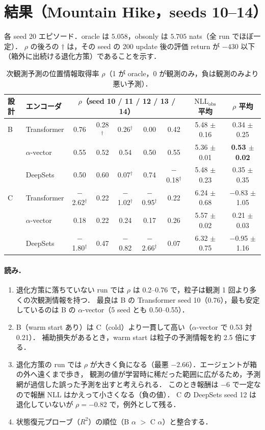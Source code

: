\documentclass[a4paper,11pt]{article}
\begin{document}
\section{結果（Mountain Hike，seeds 10--14）}

各 seed 20 エピソード．oracle は $5.058$，obsonly は $5.705$ nats（全 run でほぼ一定）．
$\rho$ の後ろの $\dagger$ は，その seed の 200 update 後の評価 return が $-430$ 以下（箱外に出続ける退化方策）であることを示す．

\begin{table}[htbp]
\centering
\small
\begin{tabular}{llccccccc}
\toprule
設計 & エンコーダ & \multicolumn{5}{c}{$\rho$（seed 10 / 11 / 12 / 13 / 14）} & $\mathrm{NLL}_{\mathrm{obs}}$ 平均 & $\rho$ 平均 \\
\midrule
B & Transformer   & 0.76 & 0.28$^\dagger$ & 0.26$^\dagger$ & 0.00 & 0.42 & 5.48 $\pm$ 0.16 & 0.34 $\pm$ 0.25 \\
  & $\alpha$-vector & 0.55 & 0.52 & 0.54 & 0.50 & 0.55 & 5.36 $\pm$ 0.01 & \textbf{0.53 $\pm$ 0.02} \\
  & DeepSets      & 0.50 & 0.60 & 0.07$^\dagger$ & 0.74 & $-$0.18$^\dagger$ & 5.48 $\pm$ 0.23 & 0.35 $\pm$ 0.35 \\
\midrule
C & Transformer   & $-$2.62$^\dagger$ & 0.22 & $-$1.02$^\dagger$ & $-$0.95$^\dagger$ & 0.22 & 6.24 $\pm$ 0.68 & $-$0.83 $\pm$ 1.05 \\
  & $\alpha$-vector & 0.18 & 0.22 & 0.24 & 0.17 & 0.26 & 5.57 $\pm$ 0.02 & 0.21 $\pm$ 0.03 \\
  & DeepSets      & $-$1.80$^\dagger$ & 0.47 & $-$0.82 & $-$2.66$^\dagger$ & 0.07 & 6.32 $\pm$ 0.75 & $-$0.95 $\pm$ 1.16 \\
\bottomrule
\end{tabular}
\caption{次観測予測の位置情報取得率 $\rho$（1 が oracle，0 が観測のみ，負は観測のみより悪い予測）．}
\end{table}

\paragraph{読み．}
\begin{enumerate}
  \item 退化方策に落ちていない run では $\rho$ は 0.2--0.76 で，粒子は観測 1 回より多くの次観測情報を持つ．
        最良は B の Transformer seed 10（0.76），最も安定しているのは B の $\alpha$-vector（5 seed とも 0.50--0.55）．
  \item B（warm start あり）は C（cold）より一貫して高い（$\alpha$-vector で 0.53 対 0.21）．
        補助損失があるとき，warm start は粒子の予測情報を約 2.5 倍にする．
  \item 退化方策の run では $\rho$ が大きく負になる（最悪 $-2.66$）．エージェントが箱の外へ遠くまで歩き，
        観測の値が学習時に稀だった範囲に広がるため，予測網が過信した誤った予測を出すと考えられる．
        このとき報酬は $-6$ で一定なので報酬 NLL はかえって小さくなる（負の値）．
        C の DeepSets seed 12 は退化していないが $\rho=-0.82$ で，例外として残る．
  \item 状態復元プローブ（$R^2$）の順位（B $\alpha$ $>$ C $\alpha$）と整合する．
\end{enumerate}
\end{document}

